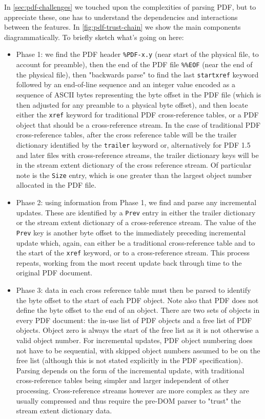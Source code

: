 In \cref{sec:pdf-challenges} we touched upon the complexities of parsing
PDF, but to appreciate these, one has to understand the
dependencies and interactions between the features.
In \cref{fig:pdf-trust-chain} we show the main components diagrammatically.
To briefly sketch what's going on here:
\begin{itemize}
\item Phase 1: we find the PDF header \verb|%PDF-x.y| (near start of the physical file, to account for preamble), then the end of the PDF file \verb|%%EOF| (near the end of the physical file), then "backwards parse" to find the last \verb|startxref| keyword followed by an end-of-line sequence and an integer value encoded as a sequence of ASCII bytes representing the byte offset in the PDF file (which is then adjusted for any preamble to a physical byte offset), and then locate either the \verb|xref| keyword for traditional PDF cross-reference tables, or a PDF object that should be a cross-reference stream. In the case of traditional PDF cross-reference tables, after the cross reference table will be the trailer dictionary identified by the \verb|trailer| keyword or, alternatively for PDF 1.5 and later files with cross-reference streams, the trailer dictionary keys will be in the stream extent dictionary of the cross reference stream. Of particular note is the \verb|Size| entry, which is one greater than the largest object number allocated in the PDF file. 
\item Phase 2: using information from Phase 1, we find and parse any incremental updates. These are identified by a \verb|Prev| entry in either the trailer dictionary or the stream extent dictionary of a cross-reference stream. The value of the \verb|Prev| key is another byte offset to the immediately preceding incremental update which, again, can either be a traditional cross-reference table and to the start of the \verb|xref| keyword, or to a cross-reference stream. This process  repeats, working from the most recent update back through time to the original PDF document.
\item Phase 3: data in each cross reference table must then be parsed to identify the byte offset to the start of each PDF object. Note also that PDF does not define the byte offset to the end of an object. There are two sets of objects in every PDF document: the in-use list of PDF objects and a free list of PDF objects. Object zero is always the start of the free list as it is not otherwise a valid object number. For incremental updates, PDF object numbering does not have to be sequential, with skipped object numbers assumed to be on the free list (although this is not stated explicitly in the PDF specification). Parsing depends on the form of the incremental update, with traditional cross-reference tables being simpler and larger independent of other processing. Cross-reference streams however are more complex as they are usually compressed and thus require the pre-DOM parser to "trust" the stream extent dictionary data.

\end{itemize}

